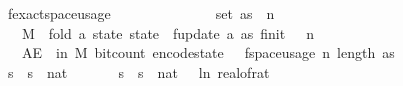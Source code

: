 \begin{isabellebody}
\endisatagproof
{\isafoldproof}%
%
\isadelimproof
\isanewline
%
\endisadelimproof
\isanewline
{}\isamarkupfalse%
\ f{}{\isacharunderscore}{\kern0pt}exact{\isacharunderscore}{\kern0pt}space{\isacharunderscore}{\kern0pt}usage{\isacharcolon}{\kern0pt}\isanewline
\ \ \ {\isachardoublequoteopen}{\isasymepsilon}\ {\isasymin}\ {\isacharbraceleft}{\kern0pt}{}{\isacharless}{\kern0pt}{\isachardot}{\kern0pt}{\isachardot}{\kern0pt}{\isacharless}{\kern0pt}{}{\isacharbraceright}{\kern0pt}{\isachardoublequoteclose}\isanewline
\ \ \ {\isachardoublequoteopen}{\isasymdelta}\ {\isachargreater}{\kern0pt}\ {}{\isachardoublequoteclose}\isanewline
\ \ \ {\isachardoublequoteopen}set\ as\ {\isasymsubseteq}\ {\isacharbraceleft}{\kern0pt}{}{\isachardot}{\kern0pt}{\isachardot}{\kern0pt}{\isacharless}{\kern0pt}n{\isacharbraceright}{\kern0pt}{\isachardoublequoteclose}\isanewline
\ \ \ {\isachardoublequoteopen}M\ {\isasymequiv}\ fold\ {\isacharparenleft}{\kern0pt}{\isasymlambda}a\ state{\isachardot}{\kern0pt}\ state\ {\isasymbind}\ f{}{\isacharunderscore}{\kern0pt}update\ a{\isacharparenright}{\kern0pt}\ as\ {\isacharparenleft}{\kern0pt}f{}{\isacharunderscore}{\kern0pt}init\ {\isasymdelta}\ {\isasymepsilon}\ n{\isacharparenright}{\kern0pt}{\isachardoublequoteclose}\isanewline
\ \ \ {\isachardoublequoteopen}AE\ {\isasymomega}\ in\ M{\isachardot}{\kern0pt}\ bit{\isacharunderscore}{\kern0pt}count\ {\isacharparenleft}{\kern0pt}encode{\isacharunderscore}{\kern0pt}state\ {\isasymomega}{\isacharparenright}{\kern0pt}\ {\isasymle}\ f{}{\isacharunderscore}{\kern0pt}space{\isacharunderscore}{\kern0pt}usage\ {\isacharparenleft}{\kern0pt}n{\isacharcomma}{\kern0pt}\ length\ as{\isacharcomma}{\kern0pt}\ {\isasymepsilon}{\isacharcomma}{\kern0pt}\ {\isasymdelta}{\isacharparenright}{\kern0pt}{\isachardoublequoteclose}\isanewline
%
\isadelimproof
%
\endisadelimproof
%
\isatagproof
{}\isamarkupfalse%
\ {\isacharminus}{\kern0pt}\isanewline
\ \ \isamarkupfalse%
\ s\ \ {\isachardoublequoteopen}s\ {\isacharequal}{\kern0pt}\ nat\ {\isasymlceil}{}\ {\isacharslash}{\kern0pt}\ {\isasymdelta}\isanewline
\ \ \isamarkupfalse%
\ s\ \ {\isachardoublequoteopen}s\ {\isacharequal}{\kern0pt}\ nat\ {\isasymlceil}{\isacharminus}{\kern0pt}{\isacharparenleft}{\kern0pt}{}{}\ {\isacharasterisk}{\kern0pt}\ ln\ {\isacharparenleft}{\kern0pt}real{\isacharunderscore}{\kern0pt}of{\isacharunderscore}{\kern0pt}rat\ {\isasymepsilon}{\isacharparenright}{\kern0pt}{\isacharparenright}{\kern0pt}{\isasymrceil}{\isachardoublequoteclose}\isanewline

\end{isabellebody}
